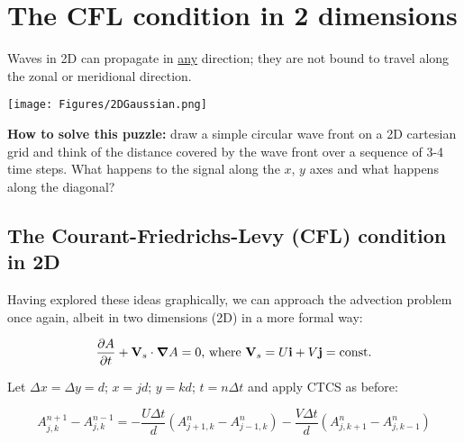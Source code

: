 \clearpage

\section{The CFL condition in 2 dimensions}

Waves in 2D can propagate in \underline{any} direction; they are not bound to travel along the zonal or meridional direction.

\begin{center}
	\texttt{[image: Figures/2DGaussian.png]}
\end{center}

\vspace{2em}
\vspace{2em}
	
{\bf How to solve this puzzle:} draw a simple circular wave front on a 2D cartesian grid and think of the distance covered by the wave front over a sequence of 3-4 time steps.
What happens to the signal along the $x$, $y$ axes and what happens along the diagonal?

\subsection{The Courant-Friedrichs-Levy (CFL) condition in 2D}

	Having explored these ideas graphically, we can approach the advection problem once again, albeit in two dimensions (2D) in a more formal way:
	
	\begin{equation}
		\frac{\partial A}{\partial t} + \mathbf{V}_s \cdot \mbox{\boldmath $\nabla$}{A} = 0 \textrm{, where } \mathbf{V}_s=U\mathbf{i}+V\mathbf{j} = \textrm{const.}
	\end{equation}
	
	Let $\Delta x = \Delta y =d$; $x=jd$; $y=kd$; $t=n \Delta t$ and apply CTCS as before:
	
	\begin{equation}
		{A_{j,k}^{n+1}-A_{j,k}^{n-1}} = - \frac{ U \Delta t}{d} \left( A_{j+1,k}^{n} - A_{j-1,k}^{n}  \right) - \frac{ V \Delta t}{d} \left( A_{j,k+1}^{n} - A_{j,k-1}^{n}  \right) 
		\label{adv-CTCS-2D}
	\end{equation}
	
